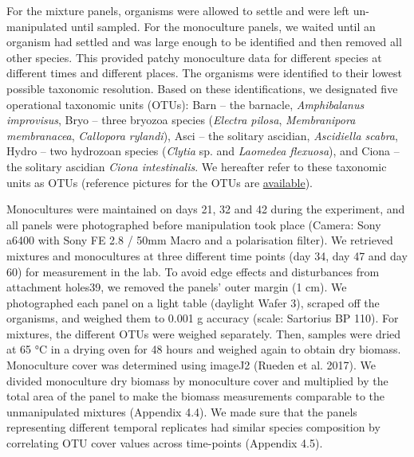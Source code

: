 \documentclass[
  letterpaper,
  DIV=11,
  numbers=noendperiod]{scrartcl}
\begin{document}
For the mixture panels, organisms were allowed to settle and were left
un-manipulated until sampled. For the monoculture panels, we waited
until an organism had settled and was large enough to be identified and
then removed all other species. This provided patchy monoculture data
for different species at different times and different places. The
organisms were identified to their lowest possible taxonomic resolution.
Based on these identifications, we designated five operational taxonomic
units (OTUs): Barn -- the barnacle, \emph{Amphibalanus improvisus}, Bryo
-- three bryozoa species (\emph{Electra pilosa}, \emph{Membranipora
membranacea}, \emph{Callopora rylandi}), Asci -- the solitary ascidian,
\emph{Ascidiella scabra}, Hydro -- two hydrozoan species (\emph{Clytia}
sp. and \emph{Laomedea flexuosa}), and Ciona -- the solitary ascidian
\emph{Ciona intestinalis}. We hereafter refer to these taxonomic units
as OTUs (reference pictures for the OTUs are
\href{https://researchbox.org/843&PEER_REVIEW_passcode=GLGJFF}{available}).

Monocultures were maintained on days 21, 32 and 42 during the
experiment, and all panels were photographed before manipulation took
place (Camera: Sony a6400 with Sony FE 2.8 / 50mm Macro and a
polarisation filter). We retrieved mixtures and monocultures at three
different time points (day 34, day 47 and day 60) for measurement in the
lab. To avoid edge effects and disturbances from attachment holes39, we
removed the panels' outer margin (1 cm). We photographed each panel on a
light table (daylight Wafer 3), scraped off the organisms, and weighed
them to 0.001 g accuracy (scale: Sartorius BP 110). For mixtures, the
different OTUs were weighed separately. Then, samples were dried at 65
°C in a drying oven for 48 hours and weighed again to obtain dry
biomass. Monoculture cover was determined using imageJ2 (Rueden et al.
2017). We divided monoculture dry biomass by monoculture cover and
multiplied by the total area of the panel to make the biomass
measurements comparable to the unmanipulated mixtures (Appendix 4.4). We
made sure that the panels representing different temporal replicates had
similar species composition by correlating OTU cover values across
time-points (Appendix 4.5).
\end{document}
